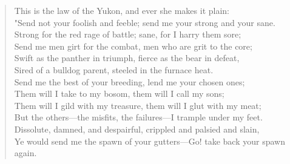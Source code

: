 
\begin{verse}

This is the law of the Yukon, and ever she makes it plain:\\
"Send not your foolish and feeble; send me your strong and your sane.\\
Strong for the red rage of battle; sane, for I harry them sore;\\
Send me men girt for the combat, men who are grit to the core;\\
Swift as the panther in triumph, fierce as the bear in defeat,\\
Sired of a bulldog parent, steeled in the furnace heat.\\
Send me the best of your breeding, lend me your chosen ones;\\
Them will I take to my bosom, them will I call my sons;\\
Them will I gild with my treasure, them will I glut with my meat;\\
But the others—the misfits, the failures—I trample under my feet.\\
Dissolute, damned, and despairful, crippled and palsied and slain,\\
Ye would send me the spawn of your gutters—Go! take back your spawn again.


\end{verse}
